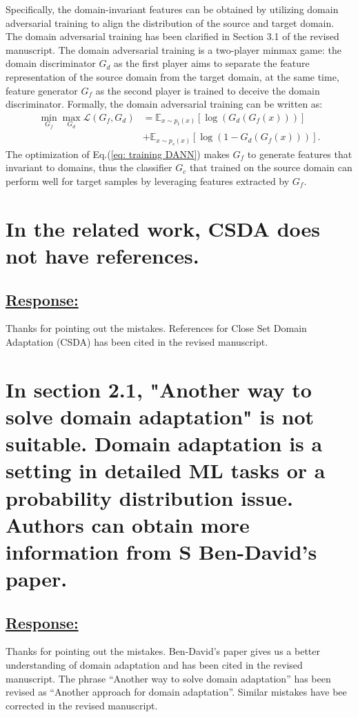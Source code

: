 Specifically, the domain-invariant features can be obtained by utilizing domain adversarial training \cite{DomainAdversrialNetwork} to align the distribution of the source and target domain. 
The domain adversarial training has been clarified in Section 3.1 of the revised manuscript. 
The domain adversarial training is a two-player minmax game: 
the domain discriminator $G_d$ as the first player aims to separate the feature representation of the source domain from the target domain, at the same time, feature generator $G_f$ as the second player is trained to deceive the domain discriminator. 
Formally, the domain adversarial training can be written as:
\begin{equation}
    \label{eq: training DANN}
    \begin{split}
        \min_{G_f} \max_{G_d} \mathscr{L}(G_f,G_d) &=\mathbb{E}_{x\sim p_t(x)} \left[ \log \left(G_d\left(G_f\left(x\right)\right)\right) \right]\\
        &+\mathbb{E}_{x\sim p_s(x)}\left[ \log \left(1-G_d\left(G_f\left(x\right)\right)\right) \right].
    \end{split}
\end{equation}
The optimization of Eq.(\ref{eq: training DANN}) makes $G_f$ to generate features that invariant to domains, thus the classifier $G_c$ that trained on the source domain can perform well for target samples by leveraging features extracted by $G_f$.

\section{
    In the related work, CSDA does not have references. 
}
\subsection*{\underline{\textbf{Response:}}}
Thanks for pointing out the mistakes.
References \cite{ben2010theory,Elsevier-DeepVisualDA,TransferLearningSurvey} for Close Set Domain Adaptation (CSDA) has been cited in the revised manuscript.

\section{
    In section 2.1, "Another way to solve domain adaptation" is not suitable. Domain adaptation is a setting in detailed ML tasks or a probability distribution issue. Authors can obtain more information from S Ben-David's paper. 
}
\subsection*{\underline{\textbf{Response:}}}
Thanks for pointing out the mistakes. 
Ben-David’s paper \cite{ben2010theory} gives us a better understanding of domain adaptation and has been cited in the revised manuscript. 
The phrase ``Another way to solve domain adaptation'' has been revised as ``Another approach for domain adaptation''.
Similar mistakes have bee corrected in the revised manuscript.

